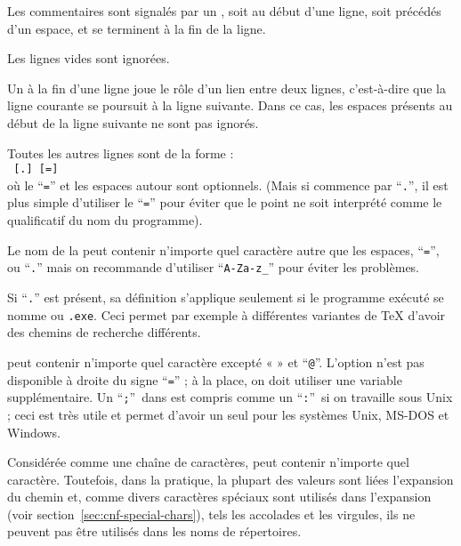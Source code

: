 \documentclass[german, english, french]{article}
\renewcommand{\samp}[1]{\enquote{\texttt{#1}}}
\begin{document}
\begin{itemize*}
\item Les commentaires sont signalés par un \code{\%}, soit au début d'une
  ligne, soit précédés d'un espace, et se terminent à la fin de la ligne.
\item Les lignes vides sont ignorées.
\item Un \bs{} à la fin d'une ligne joue le rôle d'un lien entre deux lignes,
  c'est-à-dire que la ligne courante se poursuit à la ligne suivante. Dans ce
  cas, les espaces présents au début de la ligne suivante ne sont pas ignorés.
\item Toutes les autres lignes sont de la forme :\\
  \hspace*{2em}\texttt{ \textrm{[}.\textrm{]}
    \textrm{[}=\textrm{]} }\\[1pt]
  où le \samp{=} et les espaces autour sont optionnels. (Mais si 
  commence par \samp{.}, il est plus simple d'utiliser le \samp{=} pour éviter
  que le point ne soit interprété comme le qualificatif du nom du programme).
\item Le nom de la  peut contenir n'importe quel caractère autre
  que les espaces, \samp{=}, ou \samp{.} mais on recommande d'utiliser
  \samp{A-Za-z\_} pour éviter les problèmes.
\item Si \samp{.} est présent, sa définition s'applique seulement
  si le programme exécuté se nomme \texttt{} ou
  \texttt{.exe}. Ceci permet par exemple à différentes variantes
  de \TeX{} d'avoir des chemins de recherche différents.
\item {} peut contenir n'importe quel caractère excepté « \code{\%} »
  et \samp{@}.  L'option  n'est pas disponible
  à droite du signe \samp{=} ; à la place, on doit utiliser une variable
  supplémentaire. Un \samp{;}\ dans  est compris comme un \samp{:}\
  si on travaille sous Unix ; ceci est très utile et permet d'avoir un seul
  \file{texmf.cnf} pour les systèmes Unix, MS-DOS et Windows.
\item Considérée comme une chaîne de caractères,  peut contenir
  n'importe quel caractère.  Toutefois, dans la pratique, la plupart des valeurs
  \file{texmf.cnf} sont liées l'expansion du chemin et, comme divers caractères
  spéciaux sont utilisés dans l'expansion (voir
  section~\ref{sec:cnf-special-chars}), tels les accolades et les virgules, ils
  ne peuvent pas être utilisés dans les noms de répertoires.


\end{itemize*}
\end{document}
